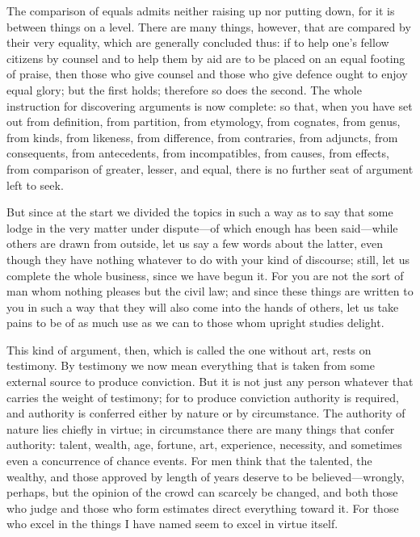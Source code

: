  The comparison of equals admits neither raising up nor putting down, for it is between things on a level. There are many things, however, that are compared by their very equality, which are generally concluded thus: if to help one's fellow citizens by counsel and to help them by aid are to be placed on an equal footing of praise, then those who give counsel and those who give defence ought to enjoy equal glory; but the first holds; therefore so does the second. The whole instruction for discovering arguments is now complete: so that, when you have set out from definition, from partition, from etymology, from cognates, from genus, from kinds, from likeness, from difference, from contraries, from adjuncts, from consequents, from antecedents, from incompatibles, from causes, from effects, from comparison of greater, lesser, and equal, there is no further seat of argument left to seek.

 But since at the start we divided the topics in such a way as to say that some lodge in the very matter under dispute—of which enough has been said—while others are drawn from outside, let us say a few words about the latter, even though they have nothing whatever to do with your kind of discourse; still, let us complete the whole business, since we have begun it. For you are not the sort of man whom nothing pleases but the civil law; and since these things are written to you in such a way that they will also come into the hands of others, let us take pains to be of as much use as we can to those whom upright studies delight.

 This kind of argument, then, which is called the one without art, rests on testimony. By testimony we now mean everything that is taken from some external source to produce conviction. But it is not just any person whatever that carries the weight of testimony; for to produce conviction authority is required, and authority is conferred either by nature or by circumstance. The authority of nature lies chiefly in virtue; in circumstance there are many things that confer authority: talent, wealth, age, fortune, art, experience, necessity, and sometimes even a concurrence of chance events. For men think that the talented, the wealthy, and those approved by length of years deserve to be believed—wrongly, perhaps, but the opinion of the crowd can scarcely be changed, and both those who judge and those who form estimates direct everything toward it. For those who excel in the things I have named seem to excel in virtue itself.

